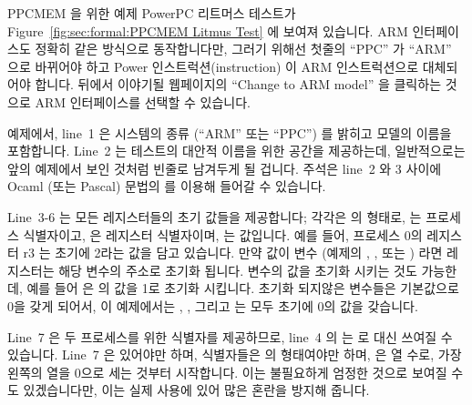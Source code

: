 PPCMEM 을 위한 예제 PowerPC 리트머스 테스트가
Figure~\ref{fig:sec:formal:PPCMEM Litmus Test}
에 보여져 있습니다.
ARM 인터페이스도 정확히 같은 방식으로 동작합니다만, 그러기 위해선 첫줄의
``PPC'' 가 ``ARM'' 으로 바뀌어야 하고 Power 인스트럭션(instruction) 이 ARM
인스트럭션으로 대체되어야 합니다.
뒤에서 이야기될 웹페이지의 ``Change to ARM model'' 을 클릭하는 것으로 ARM
인터페이스를 선택할 수 있습니다.

예제에서, line~1 은 시스템의 종류 (``ARM'' 또는 ``PPC'') 를 밝히고 모델의
이름을 포함합니다.
Line~2 는 테스트의 대안적 이름을 위한 공간을 제공하는데, 일반적으로는 앞의
예제에서 보인 것처럼 빈줄로 남겨두게 될 겁니다.
주석은 line~2 와 3 사이에 Ocaml (또는 Pascal) 문법의 \nbco{(* *)} 를 이용해
들어갈 수 있습니다.
\iffalse

An example PowerPC litmus test for PPCMEM is shown in
Figure~\ref{fig:sec:formal:PPCMEM Litmus Test}.
The ARM interface works exactly the same way, but with ARM instructions
substituted for the Power instructions and with the initial ``PPC''
replaced by ``ARM''. You can select the ARM interface by clicking on
``Change to ARM Model'' at the web page called out above.

In the example, line~1 identifies the type of system (``ARM'' or ``PPC'')
and contains the title for the model. Line~2 provides a place for an
alternative name for the test, which you will usually want to leave
blank as shown in the above example. Comments can be inserted between
lines~2 and~3 using the OCaml (or Pascal) syntax of \nbco{(* *)}.
\fi

Line~3-6 는 모든 레지스터들의 초기 값들을 제공합니다; 각각은  의
형태로,  는 프로세스 식별자이고,  은 레지스터 식별자이며,  는
값입니다.
예를 들어, 프로세스 0의 레지스터 r3 는 초기에 2라는 값을 담고 있습니다.
만약 값이 변수 (예제의 , , 또는 ) 라면 레지스터는 해당 변수의
주소로 초기화 됩니다.
변수의 값을 초기화 시키는 것도 가능한데, 예를 들어  은  의 값을
1로 초기화 시킵니다.
초기화 되지않은 변수들은 기본값으로 0을 갖게 되어서, 이 예제에서는 ,
, 그리고  는 모두 초기에 0의 값을 갖습니다.

Line~7 은 두 프로세스를 위한 식별자를 제공하므로, line~4 의  는
 로 대신 쓰여질 수 있습니다.
Line~7 은 있어야만 하며, 식별자들은  의 형태여야만 하며,  은 열
수로, 가장 왼쪽의 열을 0으로 세는 것부터 시작합니다.
이는 불필요하게 엄정한 것으로 보여질 수도 있겠습니다만, 이는 실제 사용에 있어
많은 혼란을 방지해 줍니다.
\iffalse

